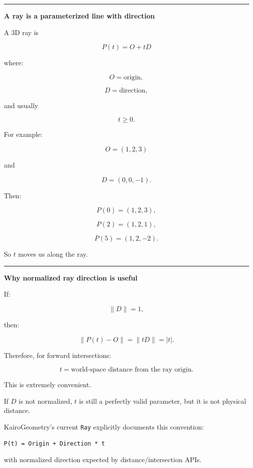 \hypertarget{04-visual-computing-ii-ch028-rays-as-geometric-visibility-queries}{}

\begin{center}\rule{0.5\linewidth}{0.5pt}\end{center}

\textbf{A ray is a parameterized line with direction}

A 3D ray is

\[
\boxed{
P(t)=O+tD
}
\]

where:

\[
O=\text{origin},
\]

\[
D=\text{direction},
\]

and usually

\[
t\ge0.
\]

For example:

\[
O=(1,2,3)
\]

and

\[
D=(0,0,-1).
\]

Then:

\[
P(0)=(1,2,3),
\]

\[
P(2)=(1,2,1),
\]

\[
P(5)=(1,2,-2).
\]

So \(t\) moves us along the ray.

\begin{center}\rule{0.5\linewidth}{0.5pt}\end{center}

\textbf{Why normalized ray direction is useful}

If:

\[
\|D\|=1,
\]

then:

\[
\|P(t)-O\|
=
\|tD\|
=
|t|.
\]

Therefore, for forward intersections:

\[
\boxed{t=\text{world-space distance from the ray origin}.}
\]

This is extremely convenient.

If \(D\) is not normalized, \(t\) is still a perfectly valid parameter, but it is not physical distance.

KairoGeometry's current \texttt{Ray} explicitly documents this convention:

\begin{verbatim}
P(t) = Origin + Direction * t
\end{verbatim}

with normalized direction expected by distance/intersection APIs.

